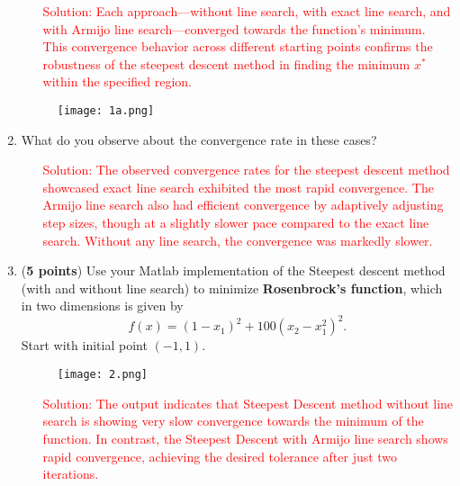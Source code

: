 \documentclass[11pt]{article}
\begin{document}
\begin{enumerate}
\begin{enumerate}
\item[\textcolor{red}{Solution:}]
\textcolor{red}{
Each approach—without line search, with exact line search, and with Armijo line search—converged towards the function's minimum. This convergence behavior across different starting points confirms the robustness of the steepest descent method in finding the minimum $x^*$ within the specified region.}
\end{enumerate}


    \begin{figure}[H]
    \centering
    \texttt{[image: 1a.png]} 
    \end{figure}

  
\item What do you observe about the convergence rate in these cases?

\begin{enumerate}
\item[\textcolor{red}{Solution:}]
\textcolor{red}{
The observed convergence rates for the steepest descent method showcased exact line search exhibited the most rapid convergence. The Armijo line search also had efficient convergence by adaptively adjusting step sizes, though at a slightly slower pace compared to the exact line search. Without any line search, the convergence was markedly slower.}
\end{enumerate}






\item ({\bf 5 points}) Use your Matlab implementation of the
  Steepest descent method (with and without line search) to minimize
  \textbf{Rosenbrock's function}, which in two dimensions is given by
  $$
  f(x) = (1 - x_1)^2 + 100(x_2 - x_1^2)^2.
  $$
  Start with initial point $(-1,1)$.




    \begin{figure}[H]
    \centering
    \texttt{[image: 2.png]} 
    \end{figure}

\begin{enumerate}
    \item[\textcolor{red}{Solution:}] 
    \textcolor{red}{
The output indicates that Steepest Descent method without line search is showing very slow convergence towards the minimum of the function. In contrast, the Steepest Descent with Armijo line search shows rapid convergence, achieving the desired tolerance after just two iterations. }
\end{enumerate}






\end{enumerate}
\end{document}
